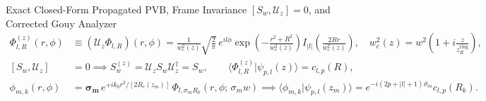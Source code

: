 \documentclass[10pt,letterpaper]{article}
\newcommand{\braket}[2]{\langle #1 | #2 \rangle}
\newcommand{\abs}[1]{\lvert #1 \rvert}
\numberwithin{equation}{section}
\begin{document}
\begin{targeteq}{Exact Closed-Form Propagated PVB, Frame Invariance $[S_w,\mathcal{U}_z]=0$, and Corrected Gouy Analyzer}
\begin{align*}
  \Phi_{l,R}^{(z)}(r,\phi) &\equiv (\mathcal{U}_z \Phi_{l,R})(r,\phi) = \frac{1}{w_c^2(z)}\sqrt{\frac{2}{\pi}}\,e^{il\phi}\exp\!\left(-\frac{r^2+R^2}{w_c^2(z)}\right) I_{\abs{l}}\!\left(\frac{2Rr}{w_c^2(z)}\right), \quad w_c^2(z) = w^2\!\left(1 + i\frac{z}{z_R^{\mathrm{ring}}}\right), \\
  [S_w, \mathcal{U}_z] &= 0 \implies S_w^{(z)} = \mathcal{U}_z S_w \mathcal{U}_z^\dagger = S_w, \qquad \braket{\Phi_{l,R}^{(z)}}{\psi_{p,l}(z)} = c_{l,p}(R), \\
  \phi_{m,k}(r,\phi) &= \mathbf{\sigma_m}\,e^{+ik_0 r^2/[2R_c(z_m)]}\,\Phi_{l,\sigma_m R_k}(r,\phi;\,\sigma_m w) \implies \braket{\phi_{m,k}}{\psi_{p,l}(z_m)} = e^{-i(2p+\abs{l}+1)\vartheta_m} c_{l,p}(R_k).
\end{align*}
\end{targeteq}
\end{document}
